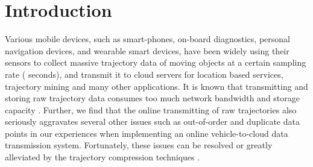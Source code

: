\section{Introduction}
\label{sec-into}

Various mobile devices, such as smart-phones, on-board diagnostics, personal navigation devices, and wearable smart devices, have been widely using their sensors to collect massive trajectory data of moving objects at a certain sampling rate ( seconds), and transmit it to cloud servers for location based services, trajectory mining and many other applications.
%
It is known that transmitting and storing raw trajectory data consumes too much network bandwidth and storage capacity \cite{Chen:Trajectory,  Chen:Fast, Meratnia:Spatiotemporal, Keogh:online, Liu:BQS, Muckell:Compression,Cao:Spatio, Popa:Spatio, Schmid:Semantic,Richter:Semantic,Long:Direction,Nibali:Trajic}.
Further, we find that the online transmitting of raw trajectories also seriously aggravates several other issues such as out-of-order and duplicate data points in our experiences when implementing an online vehicle-to-cloud data transmission system.
Fortunately, these issues can be resolved or greatly alleviated by the trajectory compression techniques \cite{Douglas:Peucker, Hershberger:Speeding, Meratnia:Spatiotemporal, Liu:BQS, Muckell:Compression, Chen:Trajectory, Chen:Fast, Keogh:online, Cao:Spatio, Shi:Survey, Richter:Semantic ,Long:Direction, Song:PRESS, Nibali:Trajic}.

